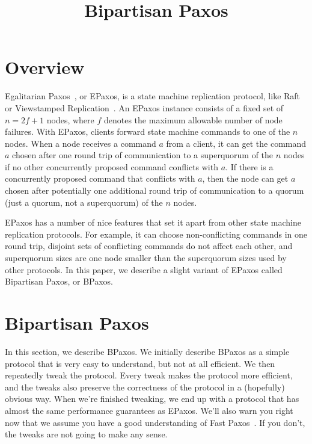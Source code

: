 \documentclass{mwhittaker}
\title{Bipartisan Paxos}
\begin{document}
\maketitle

\section{Overview}
Egalitarian Paxos~\cite{moraru2013there}, or EPaxos, is a state machine
replication protocol, like Raft~\cite{ongaro2014search} or Viewstamped
Replication~\cite{liskov2012viewstamped}. An EPaxos instance consists of a
fixed set of $n = 2f + 1$ nodes, where $f$ denotes the maximum allowable number
of node failures. With EPaxos, clients forward state machine commands to one of
the $n$ nodes. When a node receives a command $a$ from a client, it can get the
command $a$ chosen after one round trip of communication to a superquorum of
the $n$ nodes if no other concurrently proposed command conflicts with $a$. If
there is a concurrently proposed command that conflicts with $a$, then the node
can get $a$ chosen after potentially one additional round trip of communication
to a quorum (just a quorum, not a superquorum) of the $n$ nodes.

EPaxos has a number of nice features that set it apart from other state machine
replication protocols. For example, it can choose non-conflicting commands in
one round trip, disjoint sets of conflicting commands do not affect each other,
and superquorum sizes are one node smaller than the superquorum sizes used by
other protocols.
%
In this paper, we describe a slight variant of EPaxos called Bipartisan Paxos,
or BPaxos.

\section{Bipartisan Paxos}
In this section, we describe BPaxos. We initially describe BPaxos as a simple
protocol that is very easy to understand, but not at all efficient. We then
repeatedly tweak the protocol. Every tweak makes the protocol more efficient,
and the tweaks also preserve the correctness of the protocol in a (hopefully)
obvious way. When we're finished tweaking, we end up with a protocol that has
almost the same performance guarantees as EPaxos.
%
We'll also warn you right now that we assume you have a good understanding of
Fast Paxos~\cite{lamport2006fast}. If you don't, the tweaks are not going to
make any sense.
\end{document}
